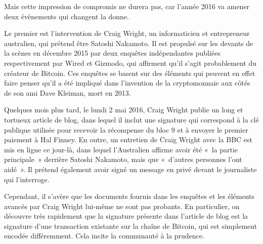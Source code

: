 Mais cette impression de compromis ne durera pas, car l'année 2016 va amener deux évènements qui changent la donne.

Le premier est l'intervention de Craig Wright, un informaticien et entrepreneur australien, qui prétend être Satoshi Nakamoto. Il est propulsé sur les devants de la scènes en décembre 2015 par deux enquêtes indépendantes publiées respectivement par Wired et Gizmodo, qui affirment qu'il s'agit probablement du créateur de Bitcoin. Ces enquêtes se basent sur des éléments qui peuvent en effet faire penser qu'il a été impliqué dans l'invention de la cryptomonnaie aux côtés de son ami Dave Kleiman, mort en 2013.

Quelques mois plus tard, le lundi 2 mai 2016, Craig Wright publie un long et tortueux article de blog, dans lequel il inclut une signature qui correspond à la clé publique utilisée pour recevoir la récompense du bloc 9 et à envoyer le premier paiement à Hal Finney. En outre, un entretien de Craig Wright avec la BBC est mis en ligne ce jour-là, dans lequel l'Australien affirme avoir été «~la partie principale~» derrière Satoshi Nakamoto, mais que «~d'autres personnes l'ont aidé~». Il prétend également avoir signé un message en privé devant le journaliste qui l'interroge.

Cependant, il s'avère que les documents fournis dans les enquêtes et les éléments avancés par Craig Wright lui-même ne sont pas probants. En particulier, on découvre très rapidement que la signature présente dans l'article de blog est la signature d'une transaction existante sur la chaîne de Bitcoin, qui est simplement encodée différemment. Cela incite la communauté à la prudence.

